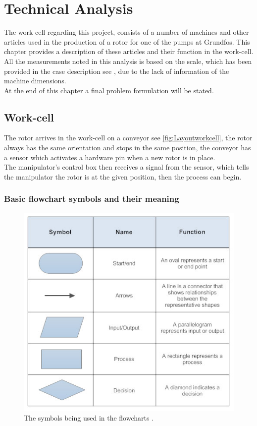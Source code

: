  \chapter{Technical Analysis} \label{TechAnalysis}
 
The work cell regarding this project, consists of a number of machines and other articles used in the production of a rotor for one of the pumps at Grundfos. This chapter provides a description of these articles and their function in the work-cell\cite{robotsave}. All the measurements noted in this analysis is based on the scale, which has been provided in the case description see \cite{Case}, due to the lack of information of the machine dimensions. \\
At the end of this chapter a final problem formulation will be stated.\\
 


 \section{Work-cell}
 The rotor arrives in the work-cell on a conveyor see \ref{fig:Layoutworkcell}, the rotor always has the same orientation and stops in the same position, the conveyor has a sensor which activates a hardware pin when a new rotor is in place.\\
 The manipulator's control box then receives a signal from the sensor, which tells the manipulator the rotor is at the given position, then the process can begin.\\
 
 \subsection{Basic flowchart symbols and their meaning}
 \begin{figure}[H]
  \centering
    \includegraphics[width=\textwidth]{TechnicalAnlysis/Basics.jpg}
    \caption{The symbols being used in the flowcharts \cite{FlowChartRef}.}  \label{fig:BasicSymbols}
\end{figure}


